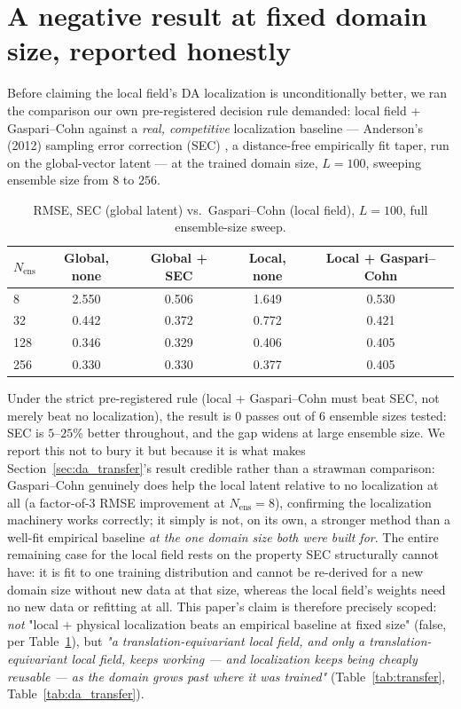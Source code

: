 \documentclass[11pt]{article}
\begin{document}
\section{A negative result at fixed domain size, reported honestly}
\label{sec:negative}

Before claiming the local field's DA localization is unconditionally
better, we ran the comparison our own pre-registered decision rule
demanded: local field + Gaspari--Cohn against a \emph{real, competitive}
localization baseline --- Anderson's (2012) sampling error correction
(SEC) \cite{anderson2012}, a distance-free empirically fit taper, run on
the global-vector latent --- at the trained domain size, $L=100$, sweeping
ensemble size from $8$ to $256$.

\begin{table}[h]
\centering
\begin{tabular}{lcccc}
\toprule
$N_{\mathrm{ens}}$ & Global, none & Global + SEC & Local, none & Local + Gaspari--Cohn \\
\midrule
8   & 2.550 & 0.506 & 1.649 & 0.530 \\
32  & 0.442 & 0.372 & 0.772 & 0.421 \\
128 & 0.346 & 0.329 & 0.406 & 0.405 \\
256 & 0.330 & 0.330 & 0.377 & 0.405 \\
\bottomrule
\end{tabular}
\caption{RMSE, SEC (global latent) vs.\ Gaspari--Cohn (local field),
$L=100$, full ensemble-size sweep.}
\label{tab:sec_vs_gc}
\end{table}

Under the strict pre-registered rule (local + Gaspari--Cohn must beat
SEC, not merely beat no localization), the result is $0$ passes out of
$6$ ensemble sizes tested: SEC is $5$--$25\%$ better throughout, and the
gap widens at large ensemble size. We report this not to bury it but
because it is what makes Section~\ref{sec:da_transfer}'s result
credible rather than a strawman comparison: Gaspari--Cohn genuinely
does help the local latent relative to no localization at all (a
factor-of-3 RMSE improvement at $N_{\mathrm{ens}}=8$), confirming the
localization machinery works correctly; it simply is not, on its own,
a stronger method than a well-fit empirical baseline \emph{at the one
domain size both were built for}. The entire remaining case for the
local field rests on the property SEC structurally cannot have: it is
fit to one training distribution and cannot be re-derived for a new
domain size without new data at that size, whereas the local field's
weights need no new data or refitting at all. This paper's claim is
therefore precisely scoped: \emph{not} "local + physical localization
beats an empirical baseline at fixed size" (false, per
Table~\ref{tab:sec_vs_gc}), but \emph{"a translation-equivariant local
field, and only a translation-equivariant local field, keeps working
--- and localization keeps being cheaply reusable --- as the domain
grows past where it was trained"} (Table~\ref{tab:transfer},
Table~\ref{tab:da_transfer}).
\end{document}
